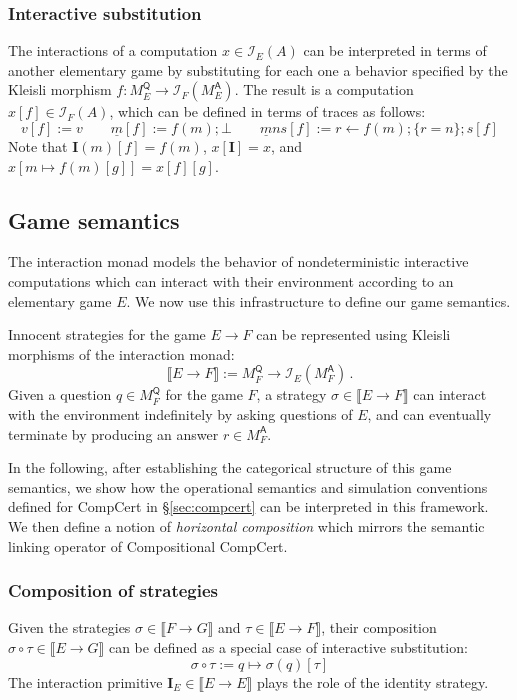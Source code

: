 \documentclass[format=sigplan,authordraft]{acmart}
\newcommand{\kw}[1]{\ensuremath{\mathsf{#1}}}
\begin{document}
\subsubsection{Interactive substitution}

The interactions of a computation $x \in \mathcal{I}_E(A)$
can be interpreted in terms of another elementary game
by substituting for each one a behavior specified by
the Kleisli morphism
$f : M_E^\kw{Q} \rightarrow \mathcal{I}_F(M_E^\kw{A})$.
The result is a computation $x[f] \in \mathcal{I}_F(A)$,
which can be defined in terms of traces as follows:
\[
  v[f] := v \qquad
  \underline{m}[f] := f(m) ; \bot \qquad
  \underline{m}ns[f] := r \leftarrow f(m) ; \{r = n\} ; s[f]
\]
Note that $\mathbf{I}(m)[f] = f(m)$,
$x[\mathbf{I}] = x$,
and $x[m \mapsto f(m)[g]] = x[f][g]$.


\subsection{Game semantics}

The interaction monad
models the behavior of
nondeterministic interactive computations
which can interact with their environment
according to an elementary game $E$.
We now use this infrastructure
to define our game semantics.

Innocent strategies for the game $E \rightarrow F$
can be represented using Kleisli morphisms of
the interaction monad:
\[
  \llbracket E \rightarrow F \rrbracket :=
  M_F^\kw{Q} \rightarrow \mathcal{I}_E(M_F^\kw{A}) \,.
\]
Given a question $q \in M_F^\kw{Q}$ for the game $F$,
a strategy $\sigma \in \llbracket E \rightarrow F \rrbracket$
can interact with the environment
indefinitely by asking questions of $E$,
and can eventually terminate by producing an answer $r \in M_F^\kw{A}$.

In the following,
after establishing the categorical structure
of this game semantics,
we show how
the operational semantics
and simulation conventions
defined for CompCert in \S\ref{sec:compcert}
can be interpreted in this framework.
We then define a notion of \emph{horizontal composition}
which mirrors the semantic linking operator
of Compositional CompCert.

\subsubsection{Composition of strategies}

Given the strategies
$\sigma \in \llbracket F \rightarrow G \rrbracket$ and
$\tau \in \llbracket E \rightarrow F \rrbracket$,
their composition
$\sigma \circ \tau \in \llbracket E \rightarrow G \rrbracket$
can be defined as a special case of interactive substitution:
\[
    \sigma \circ \tau := q \mapsto \sigma(q)[\tau]
\]
The interaction primitive
$\mathbf{I}_E \in \llbracket E \rightarrow E \rrbracket$
plays the role of the identity strategy.
\end{document}
